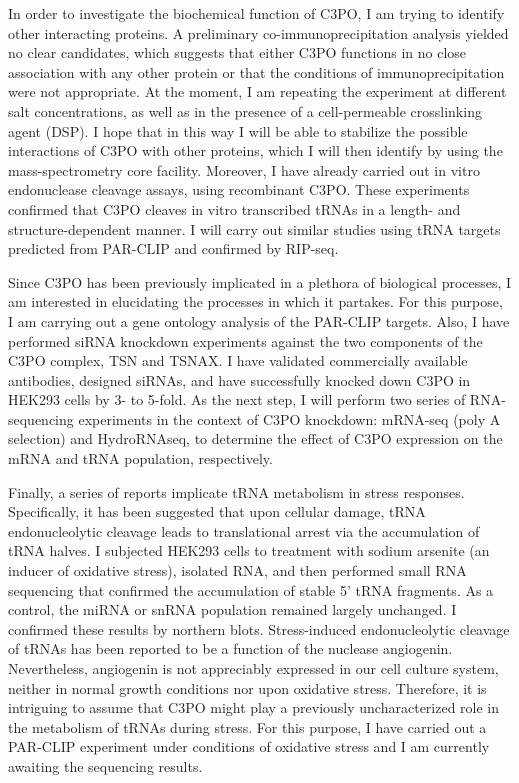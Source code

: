 \documentclass[12pt]{rockefeller}
\begin{document}
In order to investigate the biochemical function of C3PO, I am trying to identify other interacting proteins. A preliminary co-immunoprecipitation analysis yielded no clear candidates, which suggests that either C3PO functions in no close association with any other protein or that the conditions of immunoprecipitation were not appropriate. At the moment, I am repeating the experiment at different salt concentrations, as well as in the presence of a cell-permeable crosslinking agent (DSP). I hope that in this way I will be able to stabilize the possible interactions of C3PO with other proteins, which I will then identify by using the mass-spectrometry core facility. Moreover, I have already carried out in vitro endonuclease cleavage assays, using recombinant C3PO. These experiments confirmed that C3PO cleaves in vitro transcribed tRNAs in a length- and structure-dependent manner. I will carry out similar studies using tRNA targets predicted from PAR-CLIP and confirmed by RIP-seq. 

Since C3PO has been previously implicated in a plethora of biological processes, I am interested in elucidating the processes in which it partakes. For this purpose, I am carrying out a gene ontology analysis of the PAR-CLIP targets. Also, I have performed siRNA knockdown experiments against the two components of the C3PO complex, TSN and TSNAX. I have validated commercially available antibodies, designed siRNAs, and have successfully knocked down C3PO in HEK293 cells by 3- to 5-fold. As the next step, I will perform two series of RNA-sequencing experiments in the context of C3PO knockdown: mRNA-seq (poly A selection) and HydroRNAseq, to determine the effect of C3PO expression on the mRNA and tRNA population, respectively. 

Finally, a series of reports implicate tRNA metabolism in stress responses. Specifically, it has been suggested that upon cellular damage, tRNA endonucleolytic cleavage leads to translational arrest via the accumulation of tRNA halves. I subjected HEK293 cells to treatment with sodium arsenite (an inducer of oxidative stress), isolated RNA, and then performed small RNA sequencing that confirmed the accumulation of stable 5’ tRNA fragments. As a control, the miRNA or snRNA population remained largely unchanged. I confirmed these results by northern blots. Stress-induced endonucleolytic cleavage of tRNAs has been reported to be a function of the nuclease angiogenin. Nevertheless, angiogenin is not appreciably expressed in our cell culture system, neither in normal growth conditions nor upon oxidative stress. Therefore, it is intriguing to assume that C3PO might play a previously uncharacterized role in the metabolism of tRNAs during stress. For this purpose, I have carried out a PAR-CLIP experiment under conditions of oxidative stress and I am currently awaiting the sequencing results. 
\end{document}
